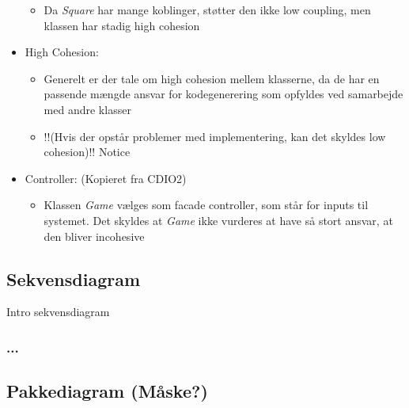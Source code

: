 \documentclass[../main.tex]{subfiles}
\begin{document}
\begin{flushleft}
\begin{itemize}
\begin{itemize}
        \item Da \textit{Square} har mange koblinger, støtter den ikke low coupling, men klassen har stadig high cohesion
    \end{itemize}
    \item High Cohesion:
    \begin{itemize}
        \item Generelt er der tale om high cohesion mellem klasserne, da de har en passende mængde ansvar for kodegenerering som opfyldes ved samarbejde med andre klasser
        \item !!(Hvis der opstår problemer med implementering, kan det skyldes low cohesion)!! Notice
    \end{itemize}
    \item Controller: (Kopieret fra CDIO2)
    \begin{itemize}
        \item Klassen \textit{Game} vælges som facade controller, som står for inputs til systemet. Det skyldes at \textit{Game} ikke vurderes at have så stort ansvar, at den bliver incohesive
    \end{itemize}
\end{itemize}
\end{flushleft}


\subsection{Sekvensdiagram }
\begin{flushleft}
\TODO Intro sekvensdiagram
\end{flushleft}

\subsubsection{...}


\subsection{Pakkediagram (Måske?) }
\end{document}

